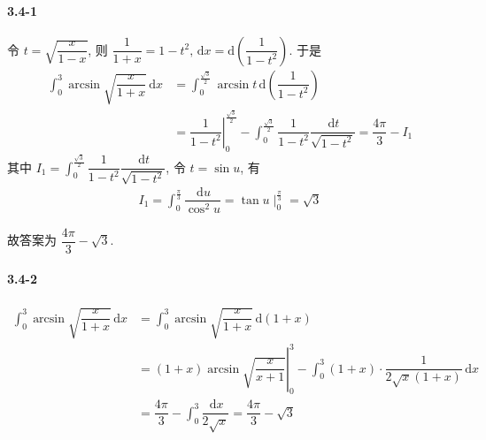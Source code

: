 \paragraph*{3.4-1} 令 $t=\sqrt{\dfrac{x}{1-x}}$, 则 $\dfrac{1}{1+x}=1-t^2,\,\mathrm{d}x=\mathrm d\left(\dfrac{1}{1-t^2}\right)$. 于是
\[
	\begin{aligned}
\int_{0}^3\arcsin\sqrt{\dfrac{x}{1+x}}\,\mathrm dx&=\int_{0}^{\frac{\sqrt{3}}{2}}\arcsin t\,\mathrm d\left(\dfrac{1}{1-t^2}\right)\\
&=\left.\dfrac{1}{1-t^2}\right|_{0}^{\frac{\sqrt{3}}{2}}-\int_{0}^{\frac{\sqrt{3}}{2}}\dfrac{1}{1-t^2}\dfrac{\,\mathrm dt}{\sqrt{1-t^2}}=\dfrac{4\pi}{3}-I_1
	\end{aligned}
\]
其中 $I_1=\displaystyle\int_{0}^{\frac{\sqrt{3}}{2}}\dfrac{1}{1-t^2}\dfrac{\,\mathrm dt}{\sqrt{1-t^2}}$, 令 $t=\sin u$, 有
\[
	\begin{aligned}
I_1=\int_{0}^{\frac{\pi}{3}}\dfrac{\,\mathrm du}{\cos^2 u}=\tan u\mid_{0}^{\frac{\pi}{3}}=\sqrt{3}
	\end{aligned}
\]

故答案为 $\dfrac{4\pi}{3}-\sqrt{3}$.
\paragraph*{3.4-2} 
\[
\begin{aligned}
\int_{0}^3\arcsin\sqrt{\dfrac{x}{1+x}}\,\mathrm dx&=\int_{0}^{3}\arcsin \sqrt{\dfrac{x}{1+x}}\,\mathrm d(1+x)\\
&=\left.(1+x)\arcsin\sqrt{\dfrac{x}{x+1}}\right|_{0}^{3}-\int_{0}^3(1+x)\cdot\dfrac{1}{2\sqrt{x}(1+x)}\,\mathrm{d}x\\
&=\dfrac{4\pi}{3}-\int_0^3\dfrac{\,\mathrm{d}x}{2\sqrt{x}}=\dfrac{4\pi}{3}-\sqrt{3}
\end{aligned}
\]
